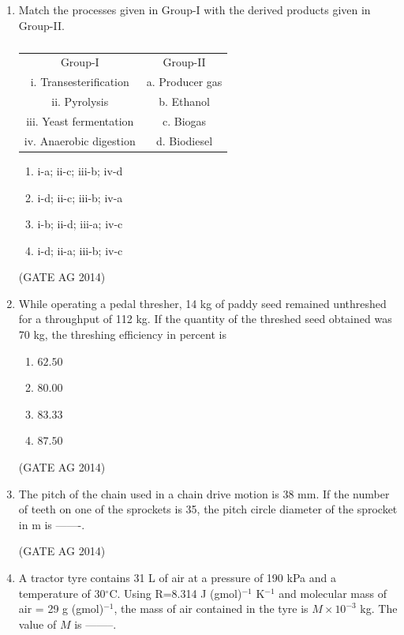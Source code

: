 \documentclass[journal,12pt,onecolumn]{IEEEtran}
\begin{document}
\begin{enumerate}
    \item Match the processes given in Group-I with the derived products given in Group-II.
    \begin{table}[H]
    \begin{tabular}{cc}
        Group-I & Group-II \\
        i. Transesterification & a. Producer gas \\
        ii. Pyrolysis & b. Ethanol \\
        iii. Yeast fermentation & c. Biogas \\
        iv. Anaerobic digestion & d. Biodiesel \\
    \end{tabular}
    \caption{}
    \label{table match the following}
    \end{table}
    \begin{enumerate}
        \item i-a; ii-c; iii-b; iv-d
        \item i-d; ii-c; iii-b; iv-a
        \item i-b; ii-d; iii-a; iv-c
        \item i-d; ii-a; iii-b; iv-c
    \end{enumerate}
    \hfill(GATE AG 2014)

    \item While operating a pedal thresher, 14 kg of paddy seed remained unthreshed for a throughput of 112 kg. If the quantity of the threshed seed obtained was 70 kg, the threshing efficiency in percent is
    \begin{multicols}{4}
    \begin{enumerate}
        \item $62.50$
        \item $80.00$
        \item $83.33$
        \item $87.50$
    \end{enumerate}
    \end{multicols}
    \hfill(GATE AG 2014)

    \item The pitch of the chain used in a chain drive motion is 38 mm. If the number of teeth on one of the sprockets is 35, the pitch circle diameter of the sprocket in m is -------.

    \hfill(GATE AG 2014)

    \item A tractor tyre contains 31 L of air at a pressure of 190 kPa and a temperature of 30$^\circ$C. Using R=8.314 J (gmol)$^{-1}$ K$^{-1}$ and molecular mass of air = 29 g (gmol)$^{-1}$, the mass of air contained in the tyre is $M \times 10^{-3}$ kg. The value of $M$ is --------.


\end{enumerate}
\end{document}
